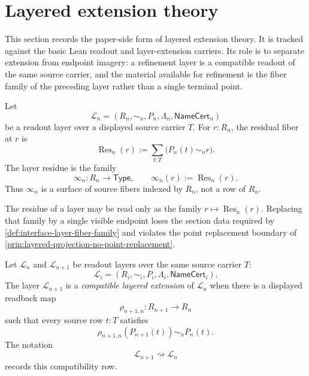 \section{Layered extension theory}
\label{sec:layered-extension-theory}

\begin{remark}
\label{rem:layered-extension-theory-status}
This section records the paper-side form of layered extension theory. It
is tracked against the basic Lean readout and layer-extension carriers. Its
role is to separate extension from endpoint imagery: a refinement layer is a
compatible readout of the same source carrier, and the material available for
refinement is the fiber family of the preceding layer rather than a single
terminal point.
\end{remark}

\begin{definition}
\label{def:layered-extension-residue}
Let
$$
\mathcal L_n=(R_n,\sim_n,P_n,\Lambda_n,\mathsf{NameCert}_n)
$$
be a readout layer over a displayed source carrier $T$. For
$r:R_n$, the residual fiber at $r$ is
$$
\operatorname{Res}_n(r)
:=
\sum_{t:T}\bigl(P_n(t)\sim_n r\bigr).
$$
The layer residue is the family
$$
\infty_n:R_n\to\mathsf{Type},
\qquad
\infty_n(r):=\operatorname{Res}_n(r).
$$
Thus $\infty_n$ is a surface of source fibers indexed by $R_n$, not a
row of $R_n$.
\end{definition}

\begin{principle}
\label{prin:layered-extension-residue-fiber-surface}
The residue of a layer may be read only as the family
$r\mapsto\operatorname{Res}_n(r)$. Replacing that family by a single
visible endpoint loses the section data required by
\autoref{def:interface-layer-fiber-family} and violates the point
replacement boundary of
\autoref{prin:layered-projection-no-point-replacement}.
\end{principle}

\begin{definition}
\label{def:compatible-layered-extension}
Let $\mathcal L_n$ and $\mathcal L_{n+1}$ be readout layers over the same
source carrier $T$:
$$
\mathcal L_i=(R_i,\sim_i,P_i,\Lambda_i,\mathsf{NameCert}_i).
$$
The layer $\mathcal L_{n+1}$ is a \emph{compatible layered extension} of
$\mathcal L_n$ when there is a displayed readback map
$$
\rho_{n+1,n}:R_{n+1}\to R_n
$$
such that every source row $t:T$ satisfies
$$
\rho_{n+1,n}(P_{n+1}(t))\sim_n P_n(t).
$$
The notation
$$
\mathcal L_{n+1}\rightsquigarrow\mathcal L_n
$$
records this compatibility row.
\end{definition}

